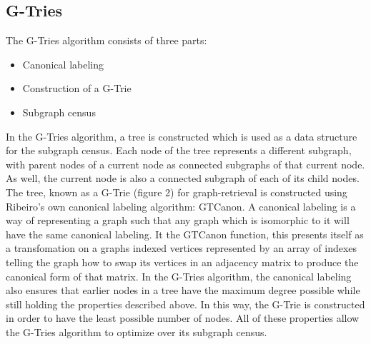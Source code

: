 \subsection{G-Tries}
The G-Tries algorithm consists of three parts:
\begin{itemize}
\item{Canonical labeling}
\item{Construction of a G-Trie}
\item{Subgraph census}
\end{itemize}
In the G-Tries algorithm, a tree is constructed which is used as a data structure for the subgraph census. Each node of the tree represents a different subgraph, with parent nodes of a current node as connected subgraphs of that current node. As well, the current node is also a connected subgraph of each of its child nodes. The tree, known as a G-Trie (figure 2) for graph-retrieval is constructed using Ribeiro's own canonical labeling algorithm: GTCanon. A canonical labeling is a way of representing a graph such that any graph which is isomorphic to it will have the same canonical labeling. It the GTCanon function, this presents itself as a transfomation on a graphs indexed vertices represented by an array of indexes telling the graph how to swap its vertices in an adjacency matrix to produce the canonical form of that matrix. In the G-Tries algorithm, the canonical labeling also ensures that earlier nodes in a tree have the maximum degree possible while still holding the properties described above. In this way, the G-Trie is constructed in order to have the least possible number of nodes. All of these properties allow the G-Tries algorithm to optimize over its subgraph census.\\
